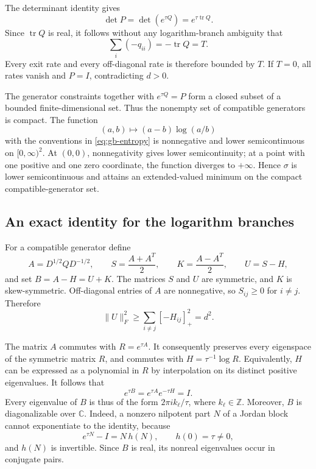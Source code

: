 The determinant identity gives
\[
 \det P=\det(e^{\tau Q})=e^{\tau\operatorname{tr}Q}.
\]
Since $\operatorname{tr}Q$ is real, it follows without any logarithm-branch
ambiguity that
\begin{equation}
 \sum_i(-q_{ii})=-\operatorname{tr}Q=T.
 \label{eq:gb-trace}
\end{equation}
Every exit rate and every off-diagonal rate is therefore bounded by
$T$. If $T=0$, all rates vanish and $P=I$, contradicting $d>0$.

The generator constraints together with $e^{\tau Q}=P$ form a closed
subset of a bounded finite-dimensional set. Thus the nonempty set of
compatible generators is compact. The function
\[
 (a,b)\longmapsto(a-b)\log(a/b)
\]
with the conventions in \eqref{eq:gb-entropy} is nonnegative and lower
semicontinuous on $[0,\infty)^2$. At $(0,0)$, nonnegativity gives lower
semicontinuity; at a point with one positive and one zero coordinate,
the function diverges to $+\infty$. Hence $\sigma$ is lower
semicontinuous and attains an extended-valued minimum on the compact
compatible-generator set.

\subsection{An exact identity for the logarithm branches}

For a compatible generator define
\[
 A=D^{1/2}QD^{-1/2},\qquad
 S=\frac{A+A^T}{2},\qquad K=\frac{A-A^T}{2},\qquad
 U=S-H,
\]
and set $B=A-H=U+K$. The matrices $S$ and $U$ are symmetric, and $K$
is skew-symmetric. Off-diagonal entries of $A$ are nonnegative, so
$S_{ij}\geq0$ for $i\ne j$. Therefore
\begin{equation}
 \|U\|_F^2\geq\sum_{i\ne j}[-H_{ij}]_+^2=d^2.
 \label{eq:gb-negative-part}
\end{equation}

The matrix $A$ commutes with $R=e^{\tau A}$. It consequently preserves
every eigenspace of the symmetric matrix $R$, and commutes with
$H=\tau^{-1}\log R$. Equivalently, $H$ can be expressed as a polynomial
in $R$ by interpolation on its distinct positive eigenvalues. It
follows that
\[
 e^{\tau B}=e^{\tau A}e^{-\tau H}=I.
\]
Every eigenvalue of $B$ is thus of the form $2\pi i k_\ell/\tau$,
where $k_\ell\in\mathbb Z$. Moreover, $B$ is diagonalizable over
$\mathbb C$. Indeed, a nonzero nilpotent part $N$ of a Jordan block
cannot exponentiate to the identity, because
\[
 e^{\tau N}-I=N\,h(N),\qquad h(0)=\tau\ne0,
\]
and $h(N)$ is invertible. Since $B$ is real, its nonreal eigenvalues
occur in conjugate pairs.

